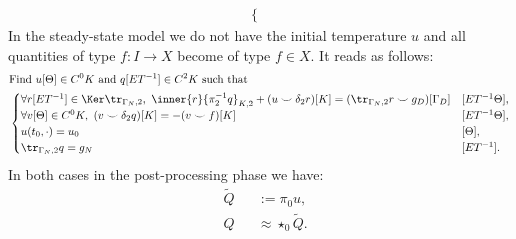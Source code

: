 \begin{formulation}
\begin{equation}
\begin{split}
\begin{cases}
      \end{cases}
    \end{split}
  \end{equation}
  In the steady-state model we do not have the initial temperature $u$
  and all quantities of type $f \colon I \to X$ become of type $f \in X$.
  It reads as follows:
  \begin{equation}
    \begin{split}
      & \text{Find $u [\Theta] \in C^0 K$ and
        $q [E T^{-1}] \in C^2 K$ such that} \\
      &
      \begin{cases}
        \forall r [E T^{-1}]\in \Ker \tr_{\Gamma_N, 2},\
          \inner{r}{\pi_2^{-1} q}_{K, 2} + (u \smile \delta_2 r)[K]
          = (\tr_{\Gamma_N, 2} r \smile g_D)[\Gamma_D] & [E T^{-1} \Theta], \\
        \forall v [\Theta]\in C^0 K,\
          (v \smile \delta_2 q)[K] = - (v \smile f)[K] & [E T^{-1} \Theta], \\
        u(t_0, \cdot) = u_0 & [\Theta], \\
        \tr_{\Gamma_N, 2} q = g_N & [E T^{-1}].
      \end{cases}
    \end{split}
  \end{equation}
  In both cases in the post-processing phase we have:
  \begin{subequations}
    \begin{alignat}{2}
      & \tilde{Q} && := \pi_0 u, \\
      & Q && \approx \star_0 \tilde{Q}.
    \end{alignat}
  \end{subequations}
\end{formulation}
